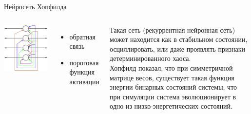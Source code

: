 \documentclass[10pt]{beamer}
\begin{document}
\begin{frame}{Нейросеть Хопфилда}

\begin{columns}
    \includegraphics[width=1\textwidth]{images/Hopfield-net.png}
	\begin{itemize}
		\item обратная связь
		\item пороговая функция активации
	\end{itemize}	    
	Такая сеть (рекуррентная нейронная сеть) может находится как в стабильном состоянии, осциллировать, или даже проявлять признаки детерминированного хаоса. \\
	Хопфилд показал, что при симметричной матрице весов, существует такая функция энергии бинарных состояний системы, что при симуляции система эволюционирует в одно из низко-энергетических состояний.
\end{columns}

\end{frame}
\end{document}
